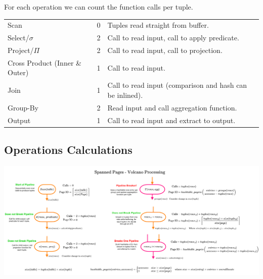 For each operation we can count the function calls per tuple.
\begin{center}
  \begin{tabular}{l l p{}}
    Scan                           & 0 & Tuples read straight from buffer.                        \\
    Select/$\sigma$                & 2 & Call to read input, call to apply predicate.             \\
    Project/$\Pi$                  & 2 & Call to read input, call to projection.                  \\
    Cross Product (Inner \& Outer) & 1 & Call to read input.                                      \\
    Join                           & 1 & Call to read input (comparison and hash can be inlined). \\
    Group-By                       & 2 & Read input and call aggregation function.                \\
    Output                         & 1 & Call to read input and extract to output.                \\
  \end{tabular}
\end{center}

\subsection{Operations Calculations}
\begin{center}
  \includegraphics[width=\textwidth]{processing_models/images/spanned_pages_volcano_processing_calcs.drawio.png}
\end{center}

